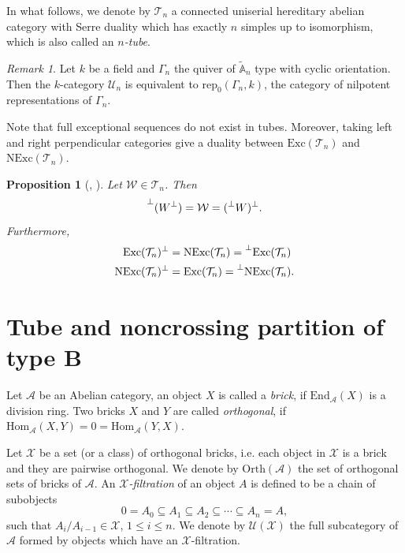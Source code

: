 \documentclass[a4paper, 11pt, reqno]{amsart}
\numberwithin{equation}{section}
\newtheorem{prop}[thm]{Proposition}
\theoremstyle{remark}
\newtheorem{rmk}[thm]{Remark}
\theoremstyle{definition}
\begin{document}
In what follows, we denote by $\mathcal T_n$ a connected uniserial hereditary abelian category with Serre duality which has exactly $n$ simples up to isomorphism, which is also called an \emph{$n$-tube}. 

\begin{rmk}
   { \rm Let $k$ be a field and $\Gamma _n$ the quiver of $\tilde{\mathbb A}_n$ type with cyclic orientation. Then the $k$-category $\mathcal U_n$ is equivalent to $\mathrm{rep}_0(\Gamma_n, k)$, the category of nilpotent representations of $\Gamma_n$. }
\end{rmk}

Note that full exceptional sequences do not exist in tubes. Moreover, taking left and right perpendicular categories give a duality between $\mathrm{Exc}(\mathcal T_n)$ and $\mathrm{NExc}(\mathcal T_n)$.

\begin{prop} [{\cite[Theorem 2.3.25]{dichev2009thick}, \cite[Proposition 4.6]{cheng2024wide}}] \label{tube perpendicular}
   Let $\mathcal W \in \mathcal T_n$. Then
   \[\prescript{\perp}{}{(W^{\perp})}=\mathcal W=(\prescript{\perp}{}{W})^{\perp}.\]
   Furthermore,
   \begin{align*}
      \mathrm{Exc}(\mathcal T_n)^{\perp}&=\mathrm{NExc}(\mathcal T_n)=\prescript{\perp}{}{\mathrm{Exc}(\mathcal T_n)} \\
      \mathrm{NExc}(\mathcal T_n)^{\perp}&=\mathrm{Exc}(\mathcal T_n)=\prescript{\perp}{}{\mathrm{NExc}(\mathcal T_n)}.
   \end{align*}
\end{prop}






\section{Tube and noncrossing partition of type B}

Let $\mathcal A$ be an Abelian category, an object $X$ is called a \emph{brick}, if $\mathrm{End}_{\mathcal A}(X)$ is a division ring. Two bricks $X$ and $Y$ are called \emph{orthogonal}, if $\mathrm{Hom}_{\mathcal A}(X,Y)=0=\mathrm{Hom}_{\mathcal A}(Y,X)$. 

Let $\mathcal X$ be a set (or a class) of orthogonal bricks, i.e. each object in $\mathcal X$ is a brick and they are pairwise orthogonal. We denote by $\mathrm{Orth}(\mathcal A)$ the set of orthogonal sets of bricks of $\mathcal A$. An \emph{$\mathcal X$-filtration} of an object $A$ is defined to be a chain of subobjects
\[
      0=A_0 \subseteq A_1 \subseteq A_2 \subseteq \cdots \subseteq A_n=A,
\]
such that $A_i/A_{i-1} \in \mathcal X$, $1 \leq i \leq n$. We denote by $\mathcal U(\mathcal X)$ the full subcategory of $\mathcal A$ formed by objects which have an $\mathcal X$-filtration. 
\end{document}
